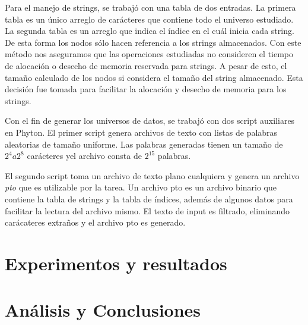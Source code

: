 \documentclass[12pt,letterpaper,hidelinks]{extarticle}
\begin{document}
Para el manejo de strings, se trabajó con una tabla de dos entradas. La primera tabla es un único arreglo de carácteres que contiene todo el universo estudiado. La segunda tabla es un arreglo que indica el índice en el cuál inicia cada string.
De esta forma los nodos sólo hacen referencia a los strings almacenados. Con este método nos aseguramos que las operaciones estudiadas no consideren el tiempo de alocación o desecho de memoria reservada para strings.
A pesar de esto, el tamaño calculado de los nodos si considera el tamaño del string almacenado.
Esta decisión fue tomada para facilitar la alocación y desecho de memoria para los strings.

Con el fin de generar los universos de datos, se trabajó con dos script auxiliares en Phyton.
El primer script genera archivos de texto con listas de palabras aleatorias de tamaño uniforme. Las palabras generadas tienen un tamaño de $2^4 a 2^8$ carácteres yel archivo consta de $2^15$ palabras.

El segundo script toma un archivo de texto plano cualquiera y genera un archivo \textit{pto} que es utilizable por la tarea.
Un archivo pto es un archivo binario que contiene la tabla de strings y la tabla de índices, además de algunos datos para facilitar la lectura del archivo mismo.
El texto de input es filtrado, eliminando carácateres extraños y el archivo pto es generado.

\section{Experimentos y resultados}



\section{Análisis y Conclusiones}


%
%
%
\end{document}

